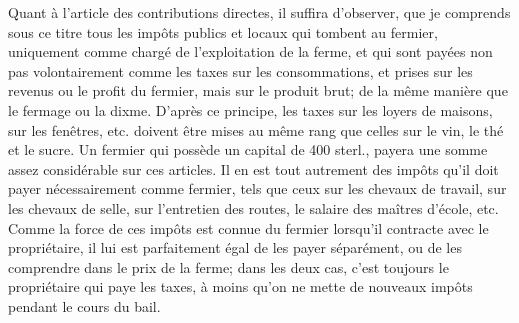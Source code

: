Quant à l'article des contributions directes, il suffira d'observer, que je comprends sous ce titre tous les impôts publics et locaux qui tombent au fermier, uniquement comme chargé de l'exploitation de la ferme, et qui sont payées non pas volontairement comme les taxes sur les consommations, et prises sur les revenus ou le profit du fermier, mais sur le produit brut; de la même manière que le fermage ou la dixme. D'après ce principe, les taxes sur les loyers de maisons, sur les fenêtres, etc. doivent être mises au même rang que celles sur le vin, le thé et le sucre. Un fermier qui possède un capital de 400 sterl., payera une somme assez considérable sur ces articles. Il en est tout autrement des impôts qu'il doit payer nécessairement comme fermier, tels que ceux sur les chevaux de travail, sur les chevaux de selle, sur l'entretien des routes, le salaire des maîtres d'école, etc.
Comme la force de ces impôts est connue du fermier lorsqu'il contracte avec le propriétaire, il lui est parfaitement égal de les payer séparément, ou de les comprendre\setcounter{page}{323} dans le prix de la ferme; dans les deux cas, c'est toujours le propriétaire qui paye les taxes, à moins qu'on ne mette de nouveaux impôts pendant le cours du bail.
